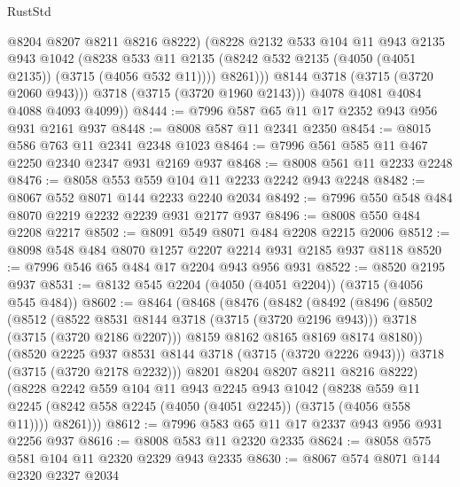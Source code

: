 \begin{lexlean}{RustStd}
\begin{coremodule}
                  @8204
                  @8207
                  @8211
                  @8216
                  @8222)
                (@8228
                  @2132
                  @533
                  @104
                  @11
                  @943
                  @2135
                  @943
                  @1042
                  (@8238
                    @533
                    @11
                    @2135
                    (@8242 @532 @2135 (@4050 (@4051 @2135)) (@3715 (@4056 @532 @11))))
                  @8261)))
            @8144
            @3718
            (@3715 (@3720 @2060 @943)))
          @3718
          (@3715 (@3720 @1960 @2143)))
        @4078
        @4081
        @4084
        @4088
        @4093
        @4099))
@8444 := @7996 @587 @65 @11 @17 @2352 @943 @956 @931 @2161 @937
@8448 := @8008 @587 @11 @2341 @2350
@8454 := @8015 @586 @763 @11 @2341 @2348 @1023
@8464 := @7996 @561 @585 @11 @467 @2250 @2340 @2347 @931 @2169 @937
@8468 := @8008 @561 @11 @2233 @2248
@8476 := @8058 @553 @559 @104 @11 @2233 @2242 @943 @2248
@8482 := @8067 @552 @8071 @144 @2233 @2240 @2034
@8492 := @7996 @550 @548 @484 @8070 @2219 @2232 @2239 @931 @2177 @937
@8496 := @8008 @550 @484 @2208 @2217
@8502 := @8091 @549 @8071 @484 @2208 @2215 @2006
@8512 := @8098 @548 @484 @8070 @1257 @2207 @2214 @931 @2185 @937 @8118
@8520 := @7996 @546 @65 @484 @17 @2204 @943 @956 @931
@8522 := @8520 @2195 @937
@8531 := @8132 @545 @2204 (@4050 (@4051 @2204)) (@3715 (@4056 @545 @484))
@8602 := @8464
    (@8468
      (@8476
        (@8482
          (@8492
            (@8496
              (@8502
                (@8512
                  (@8522 @8531 @8144 @3718 (@3715 (@3720 @2196 @943)))
                  @3718
                  (@3715 (@3720 @2186 @2207)))
                @8159
                @8162
                @8165
                @8169
                @8174
                @8180))
            (@8520 @2225 @937 @8531 @8144 @3718 (@3715 (@3720 @2226 @943)))
            @3718
            (@3715 (@3720 @2178 @2232)))
          @8201
          @8204
          @8207
          @8211
          @8216
          @8222)
        (@8228
          @2242
          @559
          @104
          @11
          @943
          @2245
          @943
          @1042
          (@8238 @559 @11 @2245 (@8242 @558 @2245 (@4050 (@4051 @2245)) (@3715 (@4056 @558 @11))))
          @8261)))
@8612 := @7996 @583 @65 @11 @17 @2337 @943 @956 @931 @2256 @937
@8616 := @8008 @583 @11 @2320 @2335
@8624 := @8058 @575 @581 @104 @11 @2320 @2329 @943 @2335
@8630 := @8067 @574 @8071 @144 @2320 @2327 @2034

\end{coremodule}
\end{lexlean}
